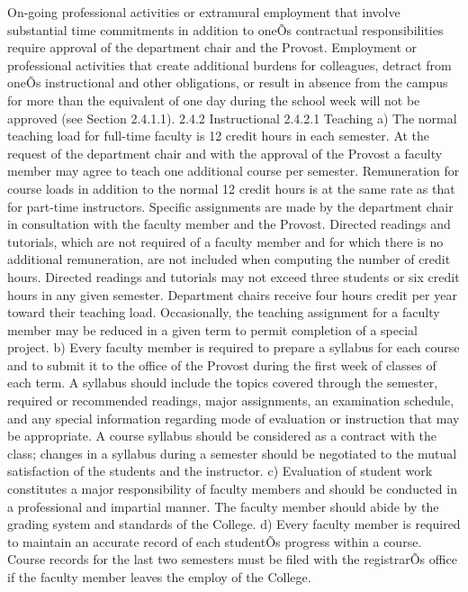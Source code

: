 \documentclass[letterpaper, 11pt]{article}
\begin{document}
   On-going professional activities or extramural employment that involve substantial time commitments in addition to oneÕs contractual responsibilities require approval of the department chair and the Provost.  Employment or professional activities that create additional burdens for colleagues, detract from oneÕs instructional and other obligations, or result in absence from the campus for more than the equivalent of one day during the school week will not be approved (see Section 2.4.1.1).
2.4.2 Instructional
2.4.2.1 Teaching
a) The normal teaching load for full-time faculty is 12 credit hours in each semester.  At the request of the department chair and with the approval of the Provost a faculty member may agree to teach one additional course per semester.  Remuneration for course loads in addition to the normal 12 credit hours is at the same rate as that for part-time instructors.  Specific assignments are made by the department chair in consultation with the faculty member and the Provost.  Directed readings and tutorials, which are not required of a faculty member and for which there is no additional remuneration, are not included when computing the number of credit hours.  Directed readings and tutorials may not exceed three students or six credit hours in any given semester.  Department chairs receive four hours credit per year toward their teaching load.  Occasionally, the teaching assignment for a faculty member may be reduced in a given term to permit completion of a special project.
b) Every faculty member is required to prepare a syllabus for each course and to submit it to the office of the Provost during the first week of classes of each term.  A syllabus should include the topics covered through the semester, required or recommended readings, major assignments, an examination schedule, and any special information regarding mode of evaluation or instruction that may be appropriate.  A course syllabus should be considered as a contract with the class; changes in a syllabus during a semester should be negotiated to the mutual satisfaction of the students and the instructor.
c) Evaluation of student work constitutes a major responsibility of faculty members and should be conducted in a professional and impartial manner.  The faculty member should abide by the grading system and standards of the College.
d) Every faculty member is required to maintain an accurate record of each studentÕs progress within a course.  Course records for the last two semesters must be filed with the registrarÕs office if the faculty member leaves the employ of the College.
\end{document}
